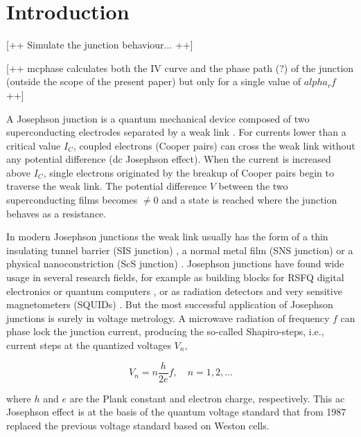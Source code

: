 \section{Introduction}


[++ Simulate the junction behaviour... ++]

[++ mcphase calculates both the IV curve and the phase path (?) of the junction (outside the scope of the present paper) but only for a single value of $alpha_rf$   ++]

A Josephson junction is a quantum mechanical device composed of two superconducting electrodes separated by a weak link \cite{Barone:1982}.
For currents lower than a critical value $I_C$, coupled electrons (Cooper pairs) can cross the weak link without any potential difference (dc Josephson effect).
When the current is increased above $I_C$, single electrons originated by the breakup of Cooper pairs begin to traverse the weak link. The potential difference $V$ between the two superconducting films becomes $\neq 0$ and a state is reached where the junction behaves as a resistance.

In modern Josephson junctions the weak link usually has the form of a thin insulating tunnel barrier (SIS junction) \cite{Gurvitch:1983}, a normal metal film (SNS junction) \cite{Benz:1995} or a physical nanoconstriction (ScS junction) \cite{Cybart:2015, DeLeo:2016}. Josephson junctions have found wide usage in several research fields, for example as building blocks for RSFQ digital electronics  or quantum computers \cite{Likharev:1991}, or as radiation detectors and very sensitive magnetometers (SQUIDs) \cite{Maggi:2006b, Granata:2015}.
But the most successful application of Josephson junctions is surely in voltage metrology.
A microwave radiation of frequency $f$ can phase lock the junction current, producing the so-called Shapiro-steps, i.e., current steps at the quantized voltages $V_n$, 

\begin{equation}
	V_n = n \frac{h}{2 e} f, \quad n = 1, 2, ...
\label{eq:voltage_steps}
\end{equation}

where $h$ and $e$ are the Plank constant and electron charge, respectively. This ac Josephson effect is at the basis of the quantum voltage standard that from 1987 replaced the previous voltage standard based on Weston cells.

